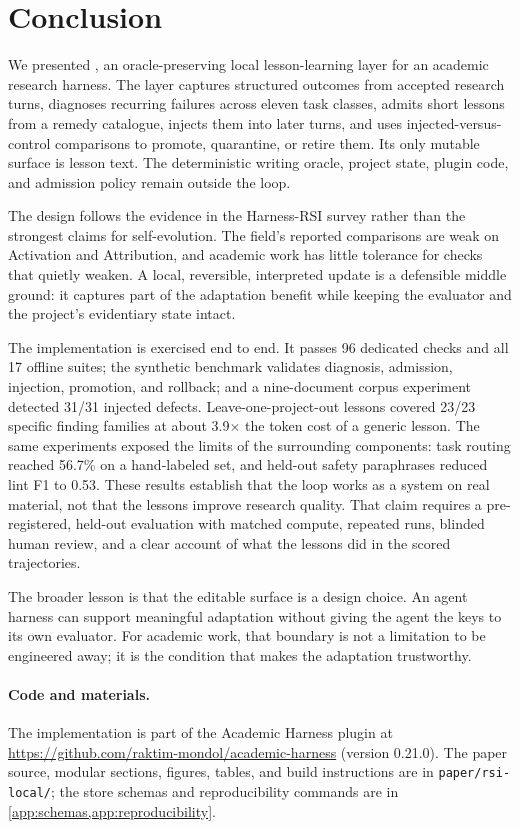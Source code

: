 \section{Conclusion}
\label{sec:conclusion}

We presented \system{}, an oracle-preserving local lesson-learning layer for an academic research harness. The layer captures structured outcomes from accepted research turns, diagnoses recurring failures across eleven task classes, admits short lessons from a remedy catalogue, injects them into later turns, and uses injected-versus-control comparisons to promote, quarantine, or retire them. Its only mutable surface is lesson text. The deterministic writing oracle, project state, plugin code, and admission policy remain outside the loop.

The design follows the evidence in the Harness-RSI survey rather than the strongest claims for self-evolution. The field's reported comparisons are weak on Activation and Attribution, and academic work has little tolerance for checks that quietly weaken. A local, reversible, interpreted update is a defensible middle ground: it captures part of the adaptation benefit while keeping the evaluator and the project's evidentiary state intact.

The implementation is exercised end to end. It passes 96 dedicated checks and all 17 offline suites; the synthetic benchmark validates diagnosis, admission, injection, promotion, and rollback; and a nine-document corpus experiment detected 31/31 injected defects. Leave-one-project-out lessons covered 23/23 specific finding families at about 3.9$\times$ the token cost of a generic lesson. The same experiments exposed the limits of the surrounding components: task routing reached 56.7\% on a hand-labeled set, and held-out safety paraphrases reduced lint F1 to 0.53. These results establish that the loop works as a system on real material, not that the lessons improve research quality. That claim requires a pre-registered, held-out evaluation with matched compute, repeated runs, blinded human review, and a clear account of what the lessons did in the scored trajectories.

The broader lesson is that the editable surface is a design choice. An agent harness can support meaningful adaptation without giving the agent the keys to its own evaluator. For academic work, that boundary is not a limitation to be engineered away; it is the condition that makes the adaptation trustworthy.

\paragraph{Code and materials.} The implementation is part of the Academic Harness plugin at \url{https://github.com/raktim-mondol/academic-harness} (version 0.21.0). The paper source, modular sections, figures, tables, and build instructions are in \texttt{paper/rsi-local/}; the store schemas and reproducibility commands are in \cref{app:schemas,app:reproducibility}.
